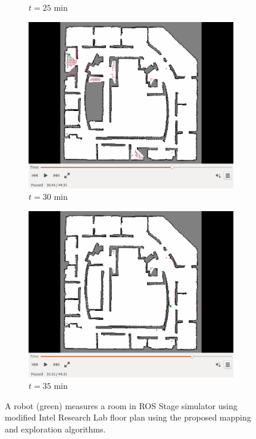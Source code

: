 \documentclass[11pt,professionalfonts,hyperref={pdftex,pdfpagemode=none,pdfstartview=FitH}]{beamer}
\begin{document}
\begin{frame}
\begin{figure}[!ht]
\begin{subfigure}[t]{0.2\columnwidth}
        \caption*{$t=25$ min}
        \label{fig:IRL25min}
    \end{subfigure}
    \begin{subfigure}[t]{0.2\columnwidth}
           \centering
           \includegraphics[trim = {4.6cm 3.8cm 4.6cm 0}, clip, width=\textwidth]{30min.png}
        \caption*{$t=30$ min}
        \label{fig:IRL30min}
    \end{subfigure}
    \begin{subfigure}[t]{0.2\columnwidth}
           \centering
           \includegraphics[trim = {4.6cm 3.8cm 4.6cm 0}, clip, width=\textwidth]{35min.png}
        \caption*{$t=35$ min}
        \label{fig:IRL35min}
    \end{subfigure}
    \caption*{A robot (green) measures a room in ROS Stage simulator using modified Intel Research Lab floor plan using the proposed mapping and exploration algorithms.}
    \label{fig:IRL}
\end{figure}



\end{frame}
\end{document}
